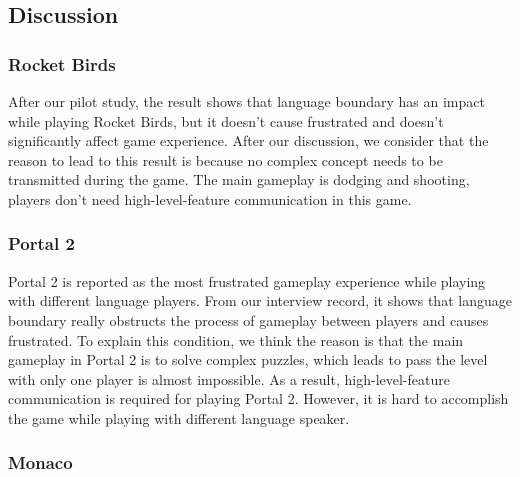\subsection{Discussion}
\subsubsection{Rocket Birds}

After our pilot study, the result shows that language boundary has an impact while playing Rocket Birds, but it doesn't cause frustrated and doesn't significantly affect game experience. After our discussion, we consider that the reason to lead to this result is because no complex concept needs to be transmitted during the game. The main gameplay is dodging and shooting, players don't need high-level-feature communication in this game.


\subsubsection{Portal 2}

Portal 2 is reported as the most frustrated gameplay experience while playing with different language players. From our interview record, it shows that language boundary really obstructs the process of gameplay between players and causes frustrated. To explain this condition, we think the reason is that the main gameplay in Portal 2 is to solve complex puzzles, which leads to pass the level with only one player is almost impossible. As a result, high-level-feature communication is required for playing Portal 2. However, it is hard to accomplish the game while playing with different language speaker.


\subsubsection{Monaco}

